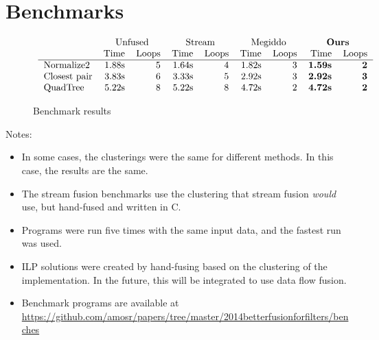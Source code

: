 \section{Benchmarks}
\label{s:Benchmarks}

\begin{figure*}
$$\begin{array}{c}

\begin{tabular}{lrrrrrrrr}
                &   \multicolumn{2}{c}{Unfused}         & \multicolumn{2}{c}{Stream}
                & \multicolumn{2}{c}{Megiddo} &\multicolumn{2}{c}{\textbf{Ours}} \\
                & Time & Loops   & Time & Loops      & Time & Loops & Time & Loops   \\
\hline
Normalize2      & 1.88s & 5      & 1.64s & 4          & 1.82s & 3  & \textbf{1.59s} & \textbf{2}\\
Closest pair    & 3.83s & 6      & 3.33s & 5          & 2.92s & 3  & \textbf{2.92s} & \textbf{3}\\
QuadTree        & 5.22s & 8      & 5.22s & 8          & 4.72s & 2  & \textbf{4.72s} & \textbf{2}\\
\end{tabular}

\end{array}$$
\caption{Benchmark results}
\label{f:BenchResults}
\end{figure*}

Notes:
\begin{itemize}
\item
In some cases, the clusterings were the same for different methods. In this case, the results are the same. 
\item
The stream fusion benchmarks use the clustering that stream fusion \emph{would} use, but hand-fused and written in C.
\item
Programs were run five times with the same input data, and the fastest run was used.
\item
ILP solutions were created by hand-fusing based on the clustering of the implementation. In the future, this will be integrated to use data flow fusion.
\item
Benchmark programs are available at \url{https://github.com/amosr/papers/tree/master/2014betterfusionforfilters/benches}
\end{itemize}


